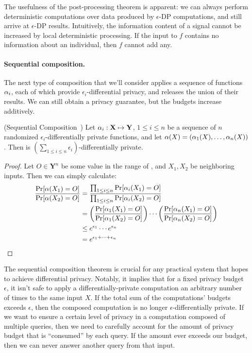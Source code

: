 \documentclass[11pt,twoside]{scrartcl}
\begin{document}
The usefulness of the post-processing theorem is apparent: we can always perform deterministic computations over data produced by $\epsilon$-DP computations, and still arrive at $\epsilon$-DP results. Intuitively, the information content of a signal cannot be increased by local deterministic processing. If the input to $f$ contains no information about an individual, then $f$ cannot add any.

\paragraph{Sequential composition.} The next type of composition that we'll consider applies a sequence of functions $\alpha_i$, each of which provide $\epsilon_i$-differential privacy, and releases the union of their results. We can still obtain a privacy guarantee, but the budgets increase additively.

\begin{theorem}{(Sequential Composition~\cite{McSherry2009})}
Let $\alpha_i : \mathbf{X} \mapsto \mathbf{Y}$, $1 \le i \le n$ be a sequence of $n$ randomized $\epsilon_i$-differentially private functions, and let $\alpha(X) = (\alpha_1(X), \ldots, \alpha_n(X))$. Then \san is $(\sum_{1 \le i \le n} \epsilon_i)$-differentially private.
\end{theorem}

\begin{proof}
Let $O \in \mathbf{Y}^n$ be some value in the range of \san, and $X_1, X_2$ be neighboring inputs. Then we can simply calculate:
\begin{align*}
\frac{
  \mathrm{Pr}[\alpha(X_1) = O]
}{
  \mathrm{Pr}[\alpha(X_2) = O]
}
&=
\frac{
  \prod_{1 \le i \le n} \mathrm{Pr}[\alpha_i(X_1) = O]
}{
  \prod_{1 \le i \le n} \mathrm{Pr}[\alpha_i(X_2) = O]
}
\\
&=
\left(
\frac{
  \mathrm{Pr}[\alpha_1(X_1) = O]
}{
  \mathrm{Pr}[\alpha_1(X_2) = O]
}
\right)
\cdots
\left(
\frac{
  \mathrm{Pr}[\alpha_n(X_1) = O]
}{
  \mathrm{Pr}[\alpha_n(X_2) = O]
}
\right)
\\
&\le
e^{\epsilon_1}\cdots e^{\epsilon_n}
\\
&=
e^{\epsilon_1 + \cdots + \epsilon_n}
\end{align*}
\end{proof}

The sequential composition theorem is crucial for any practical system that hopes to achieve differential privacy. Notably, it implies that for a fixed privacy budget $\epsilon$, it isn't safe to apply a differentially-private computation an arbitrary number of times to the same input $X$. If the total sum of the computations' budgets exceeds $\epsilon$, then the composed computation is no longer $\epsilon$-differentially private. If we want to ensure a certain level of privacy in a computation composed of multiple queries, then we need to carefully account for the amount of privacy budget that is ``consumed''  by each query. If the amount ever exceeds our budget, then we can never answer another query from that input.
\end{document}

